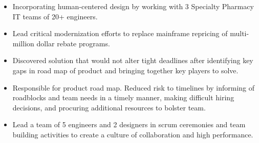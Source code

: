 \documentclass[10pt,a4paper]{altacv}
\begin{document}
\begin{itemize}
\item Incorporating human-centered design by working with 3 Specialty Pharmacy IT teams of 20+ engineers.  
\item Lead critical modernization efforts to replace mainframe repricing of multi-million dollar rebate programs.
\item Discovered solution that would not alter tight deadlines after identifying key gaps in road map of product and bringing together key players to solve. 
\item Responsible for product road map. Reduced risk to timelines by informing of roadblocks and team needs in a timely manner, making difficult hiring decisions, and procuring additional resources to bolster team.
\item Lead a team of 5 engineers and 2 designers in scrum ceremonies and team building activities to create a culture of collaboration and high performance.
\end{itemize}
\divider
\end{document}
